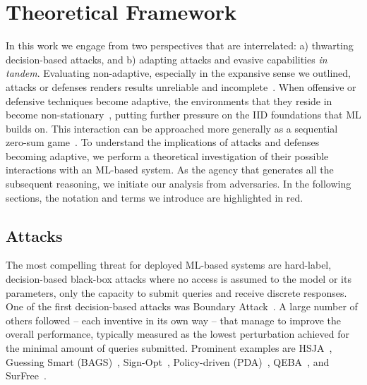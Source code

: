 \section{Theoretical Framework}
\label{sec:approach}
In this work we engage from two perspectives that are interrelated: a) thwarting decision-based attacks, and b) adapting attacks and evasive capabilities \textit{in tandem}.
Evaluating non-adaptive, especially in the expansive sense we outlined, attacks or defenses renders results unreliable and incomplete~\cite{tramer2020adaptive}.
When offensive or defensive techniques become adaptive, the environments that they reside in become non-stationary~\cite{hernandez2017survey}, putting further pressure on the IID foundations that ML builds on.
This interaction can be approached more generally as a sequential zero-sum game~\cite{littman1994markov, hardt2016strategic, bose2020adversarial}.
To understand the implications of attacks and defenses becoming adaptive, we perform a theoretical investigation of their possible interactions with an ML-based system.
As the agency that generates all the subsequent reasoning, we initiate our analysis from adversaries.
In the following sections, the notation and terms we introduce are highlighted in red.

\subsection{Attacks}
The most compelling threat for deployed ML-based systems are hard-label, decision-based black-box attacks where no access is assumed to the model or its parameters, only the capacity to submit queries and receive discrete responses.
One of the first decision-based attacks was Boundary Attack~\cite{brendel2018decision}.
A large number of others followed -- each inventive in its own way -- that manage to improve the overall performance, typically measured as the lowest perturbation achieved for the minimal amount of queries submitted.
Prominent examples are HSJA~\cite{chen2020hopskipjumpattack}, Guessing Smart (BAGS)~\cite{brunner2019guessing}, Sign-Opt~\cite{cheng2019sign}, Policy-driven (PDA)~\cite{yan2020policy}, QEBA~\cite{li2020qeba}, and SurFree~\cite{maho2021surfree}.

